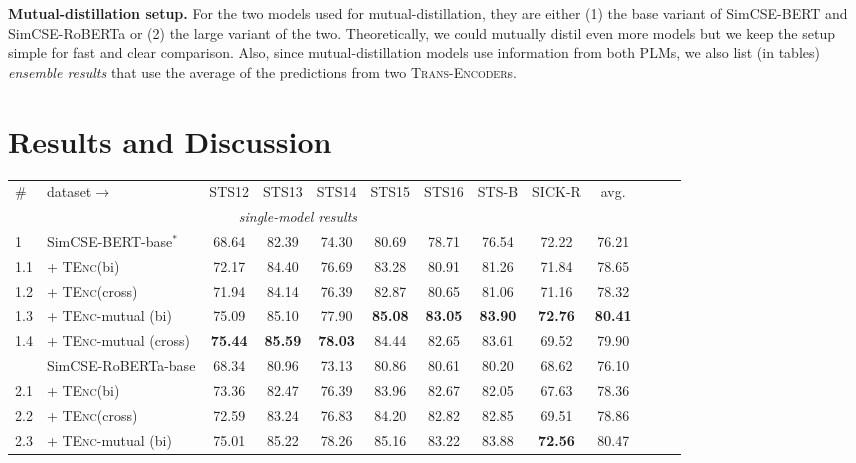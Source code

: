 \documentclass{article} \usepackage{iclr2021_conference,times}
\newcommand{\modelnames}{\textsc{Trans-Encoder}s\xspace}
\newcommand{\tenc}{\textsc{TEnc}\xspace}
\begin{document}
\textbf{Mutual-distillation setup.} 
For the two models used for mutual-distillation, they are either (1) the base variant of SimCSE-BERT and SimCSE-RoBERTa or (2) the large variant of the two. 
Theoretically, we could mutually distil even more models but we keep the setup simple for fast and clear comparison. 
Also, since mutual-distillation models use information from both PLMs, we also list (in tables) \textit{ensemble results} that use the average of the predictions from two \modelnames.




\section{Results and Discussion}


\begin{table}[!t] \setlength{\tabcolsep}{2.0pt}
\centering
\small
\begin{tabular}{llccccccccccc}
\cmidrule[1.5pt]{1-10}
\# & dataset$\rightarrow$  & STS12 & STS13 & STS14 & STS15 & STS16 & STS-B & SICK-R & avg.\\
\cmidrule[1.5pt]{1-10}
\multicolumn{9}{c}{\textit{single-model results}} \\
\cmidrule[1.0pt]{1-10}
1 & SimCSE-BERT-base$^\ast$ & 68.64 & 82.39 & 74.30 & 80.69 & 78.71 & 76.54 & 72.22 & 76.21 \\
1.1 & + \tenc (bi) & 72.17 & 84.40 & 76.69 & 83.28 & 80.91 & 81.26 & 71.84 & 78.65 \\
1.2 & + \tenc (cross) & 71.94 & 84.14 & 76.39 & 82.87 & 80.65 & 81.06 & 71.16 & 78.32\\
\rowcolor{blue!5}
1.3 & + \tenc-mutual (bi) & 75.09 & 85.10 & 77.90 & \textbf{85.08} & \textbf{83.05} & \textbf{83.90} & \textbf{72.76} & \textbf{80.41} \\
\rowcolor{blue!5}
1.4 & + \tenc-mutual (cross) & \textbf{75.44} & \textbf{85.59} & \textbf{78.03} & 84.44 & 82.65 & 83.61 & 69.52 & 79.90 \\
\hdashline
2 & SimCSE-RoBERTa-base & 68.34 & 80.96 & 73.13 & 80.86 & 80.61 & 80.20 & 68.62 & 76.10 \\
2.1 & + \tenc (bi) &   73.36 & 82.47 & 76.39 & 83.96 & 82.67  & 82.05 & 67.63 & 78.36 \\
2.2 & + \tenc (cross) & 72.59 & 83.24 & 76.83 & 84.20 & 82.82 & 82.85 & 69.51 & 78.86 \\
\rowcolor{blue!5}
2.3 & + \tenc-mutual (bi) & 75.01 & 85.22 & 78.26 & 85.16 & 83.22 & 83.88 & \textbf{72.56} & 80.47 \\

\end{tabular}
\end{table}
\end{document}
